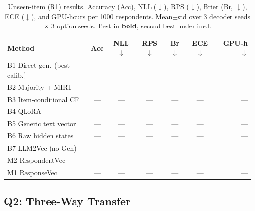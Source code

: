 \begin{table}[tb]
\centering
\small
\caption{Unseen-item (R1) results. Accuracy (Acc), NLL ($\downarrow$), RPS ($\downarrow$), Brier (Br, $\downarrow$), ECE ($\downarrow$), and GPU-hours per 1000 respondents. Mean$\pm$std over 3 decoder seeds $\times$ 3 option seeds. Best in \textbf{bold}; second best \underline{underlined}.}
\label{tab:within}
\begin{tabular}{lcccccr}
\toprule
Method & Acc & NLL$\downarrow$ & RPS$\downarrow$ & Br$\downarrow$ & ECE$\downarrow$ & GPU-h$\downarrow$ \\
\midrule
B1 Direct gen.\ (best calib.) & --- & --- & --- & --- & --- & --- \\
B2 Majority + MIRT            & --- & --- & --- & --- & --- & --- \\
B3 Item-conditional CF        & --- & --- & --- & --- & --- & --- \\
B4 QLoRA                      & --- & --- & --- & --- & --- & --- \\
B5 Generic text vector        & --- & --- & --- & --- & --- & --- \\
B6 Raw hidden states          & --- & --- & --- & --- & --- & --- \\
B7 LLM2Vec (no Gen)           & --- & --- & --- & --- & --- & --- \\
\midrule
M2 RespondentVec              & --- & --- & --- & --- & --- & --- \\
M1 ResponseVec                & --- & --- & --- & --- & --- & --- \\
\bottomrule
\end{tabular}
\end{table}

\subsection{Q2: Three-Way Transfer}
\label{sec:results-q2}

